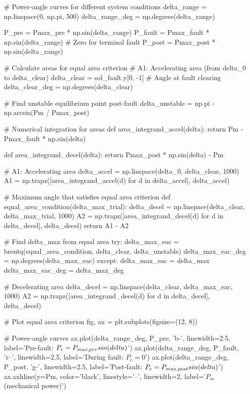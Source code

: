\documentclass[11pt,a4paper]{article}
\begin{document}
\begin{pycode}
# Power-angle curves for different system conditions
delta_range = np.linspace(0, np.pi, 500)
delta_range_deg = np.degrees(delta_range)

P_pre = Pmax_pre * np.sin(delta_range)
P_fault = Pmax_fault * np.sin(delta_range)  # Zero for terminal fault
P_post = Pmax_post * np.sin(delta_range)

# Calculate areas for equal area criterion
# A1: Accelerating area (from delta_0 to delta_clear)
delta_clear = sol_fault.y[0, -1]  # Angle at fault clearing
delta_clear_deg = np.degrees(delta_clear)

# Find unstable equilibrium point post-fault
delta_unstable = np.pi - np.arcsin(Pm / Pmax_post)

# Numerical integration for areas
def area_integrand_accel(delta):
    return Pm - Pmax_fault * np.sin(delta)

def area_integrand_decel(delta):
    return Pmax_post * np.sin(delta) - Pm

# A1: Accelerating area
delta_accel = np.linspace(delta_0, delta_clear, 1000)
A1 = np.trapz([area_integrand_accel(d) for d in delta_accel], delta_accel)

# Maximum angle that satisfies equal area criterion
def equal_area_condition(delta_max_trial):
    delta_decel = np.linspace(delta_clear, delta_max_trial, 1000)
    A2 = np.trapz([area_integrand_decel(d) for d in delta_decel], delta_decel)
    return A1 - A2

# Find delta_max from equal area
try:
    delta_max_eac = brentq(equal_area_condition, delta_clear, delta_unstable)
    delta_max_eac_deg = np.degrees(delta_max_eac)
except:
    delta_max_eac = delta_max
    delta_max_eac_deg = delta_max_deg

# Decelerating area
delta_decel = np.linspace(delta_clear, delta_max_eac, 1000)
A2 = np.trapz([area_integrand_decel(d) for d in delta_decel], delta_decel)

# Plot equal area criterion
fig, ax = plt.subplots(figsize=(12, 8))

# Power-angle curves
ax.plot(delta_range_deg, P_pre, 'b-', linewidth=2.5, label='Pre-fault: $P_e = P_{max,pre} \\sin(\\delta)$')
ax.plot(delta_range_deg, P_fault, 'r--', linewidth=2.5, label='During fault: $P_e = 0$')
ax.plot(delta_range_deg, P_post, 'g-', linewidth=2.5, label='Post-fault: $P_e = P_{max,post} \\sin(\\delta)$')
ax.axhline(y=Pm, color='black', linestyle='--', linewidth=2, label='$P_m$ (mechanical power)')


\end{pycode}
\end{document}
